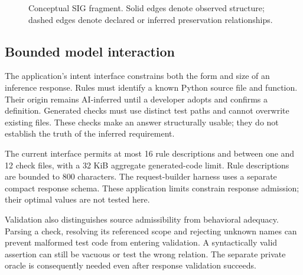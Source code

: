 \begin{figure}[t]\centering
{}
\caption{Conceptual SIG fragment. Solid edges denote observed structure; dashed edges denote declared or inferred preservation relationships.}\label{fig:sig}
\end{figure}

\ifAccess
\subsection{Bounded model interaction}
The application's intent interface constrains both the form and size of an inference response. Rules must identify a known Python source file and function. Their origin remains AI-inferred until a developer adopts and confirms a definition. Generated checks must use distinct test paths and cannot overwrite existing files. These checks make an answer structurally usable; they do not establish the truth of the inferred requirement.

The current interface permits at most 16 rule descriptions and between one and 12 check files, with a 32 KiB aggregate generated-code limit. Rule descriptions are bounded to 800 characters. The request-builder harness uses a separate compact response schema. These application limits constrain response admission; their optimal values are not tested here.

Validation also distinguishes source admissibility from behavioral adequacy. Parsing a check, resolving its referenced scope and rejecting unknown names can prevent malformed test code from entering validation. A syntactically valid assertion can still be vacuous or test the wrong relation. The separate private oracle is consequently needed even after response validation succeeds.


